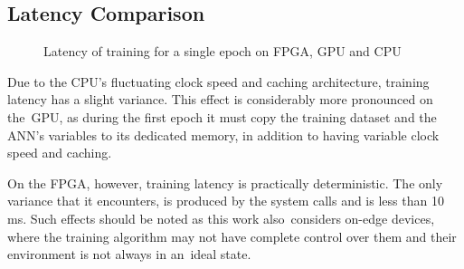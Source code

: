 \subsection{Latency Comparison}

\begin{figure}[H]
    \center
    \caption[FPGA, GPU, CPU latency comparison]{Latency of training for a single epoch on FPGA, GPU and CPU}
    \label{fig: FPGA CPU GPU latency}
\end{figure}

Due to the CPU's fluctuating clock speed and caching architecture, training latency has a slight variance. This effect is considerably more pronounced on the GPU, as during the first epoch it must copy the training dataset and the ANN's variables to its dedicated memory, in addition to having variable clock speed and caching. %

On the FPGA, however, training latency is practically deterministic. The only variance that it encounters, is produced by the system calls and is less than 10 ms. Such effects should be noted as this work also considers on-edge devices, where the training algorithm may not have complete control over them and their environment is not always in an ideal state. %

